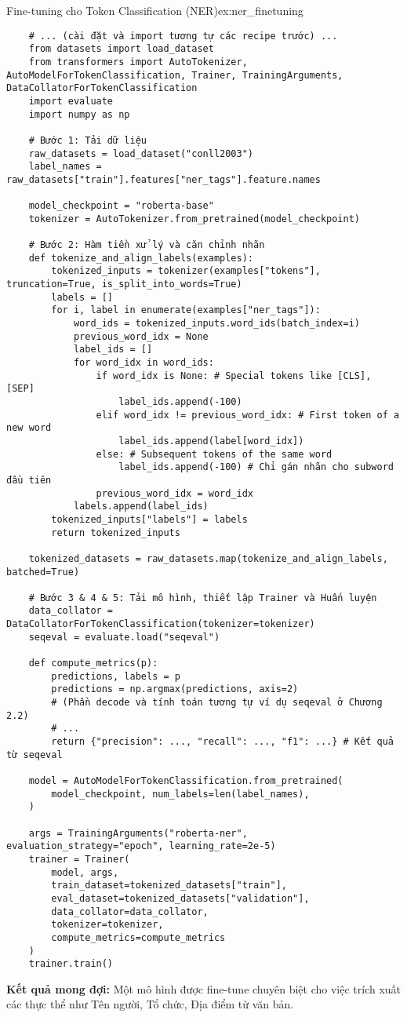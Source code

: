 \begin{example}{Fine-tuning cho Token Classification (NER)}{ex:ner_finetuning}
    \begin{verbatim}
    # ... (cài đặt và import tương tự các recipe trước) ...
    from datasets import load_dataset
    from transformers import AutoTokenizer, AutoModelForTokenClassification, Trainer, TrainingArguments, DataCollatorForTokenClassification
    import evaluate
    import numpy as np
    
    # Bước 1: Tải dữ liệu
    raw_datasets = load_dataset("conll2003")
    label_names = raw_datasets["train"].features["ner_tags"].feature.names
    
    model_checkpoint = "roberta-base"
    tokenizer = AutoTokenizer.from_pretrained(model_checkpoint)
    
    # Bước 2: Hàm tiền xử lý và căn chỉnh nhãn
    def tokenize_and_align_labels(examples):
        tokenized_inputs = tokenizer(examples["tokens"], truncation=True, is_split_into_words=True)
        labels = []
        for i, label in enumerate(examples["ner_tags"]):
            word_ids = tokenized_inputs.word_ids(batch_index=i)
            previous_word_idx = None
            label_ids = []
            for word_idx in word_ids:
                if word_idx is None: # Special tokens like [CLS], [SEP]
                    label_ids.append(-100)
                elif word_idx != previous_word_idx: # First token of a new word
                    label_ids.append(label[word_idx])
                else: # Subsequent tokens of the same word
                    label_ids.append(-100) # Chỉ gán nhãn cho subword đầu tiên
                previous_word_idx = word_idx
            labels.append(label_ids)
        tokenized_inputs["labels"] = labels
        return tokenized_inputs
    
    tokenized_datasets = raw_datasets.map(tokenize_and_align_labels, batched=True)
    
    # Bước 3 & 4 & 5: Tải mô hình, thiết lập Trainer và Huấn luyện
    data_collator = DataCollatorForTokenClassification(tokenizer=tokenizer)
    seqeval = evaluate.load("seqeval")
    
    def compute_metrics(p):
        predictions, labels = p
        predictions = np.argmax(predictions, axis=2)
        # (Phần decode và tính toán tương tự ví dụ seqeval ở Chương 2.2)
        # ...
        return {"precision": ..., "recall": ..., "f1": ...} # Kết quả từ seqeval
    
    model = AutoModelForTokenClassification.from_pretrained(
        model_checkpoint, num_labels=len(label_names),
    )
    
    args = TrainingArguments("roberta-ner", evaluation_strategy="epoch", learning_rate=2e-5)
    trainer = Trainer(
        model, args,
        train_dataset=tokenized_datasets["train"],
        eval_dataset=tokenized_datasets["validation"],
        data_collator=data_collator,
        tokenizer=tokenizer,
        compute_metrics=compute_metrics
    )
    trainer.train()
    \end{verbatim}
\end{example}
\textbf{Kết quả mong đợi:} Một mô hình được fine-tune chuyên biệt cho việc trích xuất các thực thể như Tên người, Tổ chức, Địa điểm từ văn bản.
